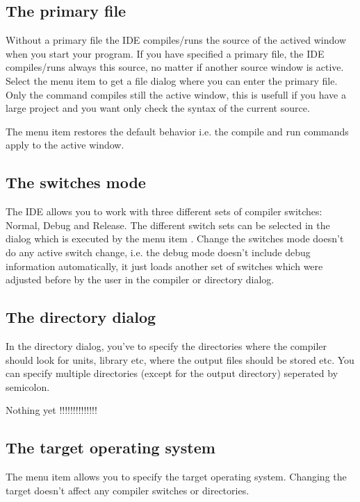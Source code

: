 \subsection{The primary file}
\label{se:primaryfile}
Without a primary file the IDE compiles/runs the source of the actived
window when you start your program. If you have specified a primary
file, the IDE compiles/runs always this source, no matter if another
source window is active. Select the menu item 
to get a file dialog where you can enter the primary file. Only the command
 compiles still the active window, this is usefull
if you have a large project and you want only check the syntax of the
current source.

The menu item  restores the default behavior
i.e. the compile and run commands apply to the active window.

\subsection{The switches mode}
\label{se:compilermode}
The IDE allows you to work with three different sets of compiler
switches: Normal, Debug and Release. The different switch
sets can be selected in the  dialog which
is executed by the menu item .
Change the switches mode doesn't do any active switch change, i.e.
the debug mode doesn't include debug information automatically,
it just loads another set of switches which were adjusted before
by the user in the compiler or directory dialog.

\subsection{The directory dialog}
In the directory dialog, you've to specify the directories where
the compiler should look for units, library etc, where the
output files should be stored etc. You can specify multiple
directories (except for the output directory) seperated by
semicolon.

\begin{description}
\item Nothing yet !!!!!!!!!!!!!!
\end{description}

\subsection{The target operating system}
The menu item  allows you to specify the target
operating system. Changing the target doesn't affect any compiler
switches or directories.

